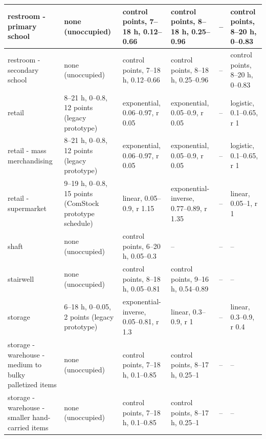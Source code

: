 \begin{center}
\begin{longtable}{|p{1.5in}|p{1.6in}|p{0.95in}|p{0.95in}|p{0.8in}|p{0.8in}|}
restroom - primary school & none (unoccupied) & control points, 7--18 h, 0.12--0.66 & control points, 8--18 h, 0.25--0.96 & -- & control points, 8--20 h, 0--0.83 \\ \hline
restroom - secondary school & none (unoccupied) & control points, 7--18 h, 0.12--0.66 & control points, 8--18 h, 0.25--0.96 & -- & control points, 8--20 h, 0--0.83 \\ \hline
retail & 8--21 h, 0--0.8, 12 points (legacy prototype) & exponential, 0.06--0.97, r 0.05 & exponential, 0.05--0.9, r 0.05 & -- & logistic, 0.1--0.65, r 1 \\ \hline
retail - mass merchandising & 8--21 h, 0--0.8, 12 points (legacy prototype) & exponential, 0.06--0.97, r 0.05 & exponential, 0.05--0.9, r 0.05 & -- & logistic, 0.1--0.65, r 1 \\ \hline
retail - supermarket & 9--19 h, 0--0.8, 15 points (ComStock prototype schedule) & linear, 0.05--0.9, r 1.15 & exponential-inverse, 0.77--0.89, r 1.35 & -- & linear, 0.05--1, r 1 \\ \hline
shaft & none (unoccupied) & control points, 6--20 h, 0.05--0.3 & -- & -- & -- \\ \hline
stairwell & none (unoccupied) & control points, 8--18 h, 0.05--0.81 & control points, 9--16 h, 0.54--0.89 & -- & -- \\ \hline
storage & 6--18 h, 0--0.05, 2 points (legacy prototype) & exponential-inverse, 0.05--0.81, r 1.3 & linear, 0.3--0.9, r 1 & -- & linear, 0.3--0.9, r 0.4 \\ \hline
storage - warehouse - medium to bulky palletized items & none (unoccupied) & control points, 7--18 h, 0.1--0.85 & control points, 8--17 h, 0.25--1 & -- & -- \\ \hline
storage - warehouse - smaller hand-carried items & none (unoccupied) & control points, 7--18 h, 0.1--0.85 & control points, 8--17 h, 0.25--1 & -- & -- \\ \hline
\end{longtable}
\end{center}
